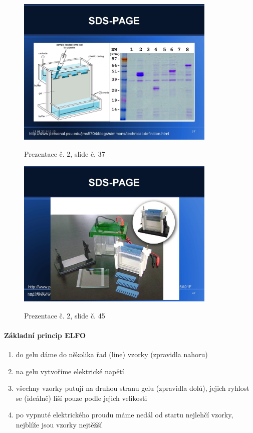 \documentclass[DIV=8]{scrreprt}
\begin{document}
\begin{figure}
    \caption{Prezentace č. 2, slide č. 37}
    \includegraphics[width=0.85\textwidth]{slides-2/slide-37.jpg}
    \centering
    \label{slides-2-slide-37}
\end{figure}
\begin{figure}
    \caption{Prezentace č. 2, slide č. 45}
    \includegraphics[width=0.85\textwidth]{slides-2/slide-45.jpg}
    \centering
    \label{slides-2-slide-45}
\end{figure}

\paragraph{Základní princip ELFO}
\begin{enumerate}[nosep]
    \item do gelu dáme do několika řad (line) vzorky (zpravidla nahoru)
    \item na gelu vytvoříme elektrické napětí
    \item všechny vzorky putují na druhou stranu gelu (zpravidla dolů), jejich ryhlost se (ideálně) liší pouze podle jejich velikosti
    \item po vypnuté elektrického proudu máme nedál od startu nejlehčí vzorky, nejblíže jsou vzorky nejtěžší
\end{enumerate}
\end{document}
